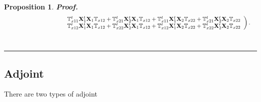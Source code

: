 \documentclass[aps, preprint]{revtex4}
\newtheorem{proposition}[theorem]{Proposition}
\newenvironment{proof}[1][Proof]{\noindent\textbf{#1.} }{\ \rule{0.5em}{0.5em}}
\begin{document}
\begin{proposition}
\begin{proof}
\begin{align}
 & \text{\quad \quad \quad \quad \quad \quad \quad \quad \quad \quad }\left .\begin{array}{c}\mathbb{T}_{x 1 1}^{t} \mathbf{X}_{1}^{t} \mathbf{X}_{1} \mathbb{T}_{x 1 2} +\mathbb{T}_{x 2 1}^{t} \mathbf{X}_{2}^{t} \mathbf{X}_{1} \mathbb{T}_{x 1 2} +\mathbb{T}_{x 1 1}^{t} \mathbf{X}_{1}^{t} \mathbf{X}_{2} \mathbb{T}_{x 2 2} +\mathbb{T}_{x 2 1}^{t} \mathbf{X}_{2}^{t} \mathbf{X}_{2} \mathbb{T}_{x 2 2} \\
\mathbb{T}_{x 1 2}^{t} \mathbf{X}_{1}^{t} \mathbf{X}_{1} \mathbb{T}_{x 1 2} +\mathbb{T}_{x 2 2}^{t} \mathbf{X}_{2}^{t} \mathbf{X}_{1} \mathbb{T}_{x 1 2} +\mathbb{T}_{x 1 2}^{t} \mathbf{X}_{1}^{t} \mathbf{X}_{2} \mathbb{T}_{x 2 2} +\mathbb{T}_{x 2 2}^{t} \mathbf{X}_{2}^{t} \mathbf{X}_{2} \mathbb{T}_{x 2 2}\end{array}\right )\text{.}\end{align}
\end{proof}


\end{proposition}

\subsection{Adjoint}
There are two types of adjoint 
\end{document}
